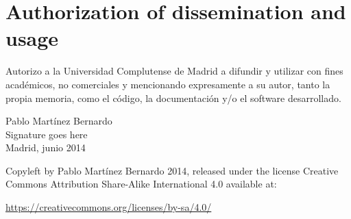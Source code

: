 
\newpage
\thispagestyle{empty}
\chapter*{Authorization of dissemination and usage}
\vfill
Autorizo a la Universidad Complutense de Madrid a difundir y utilizar con fines académicos, no comerciales y mencionando expresamente a su autor, tanto la propia memoria, como el código, la documentación y/o el software desarrollado. 
\begin{center}
  \vfill
  {\Large Pablo Martínez Bernardo\\}
  \vspace*{1cm}
  {\Huge Signature goes here\\}
  \vspace*{1cm}
  {\Large Madrid, junio 2014}
  \vfill
\end{center}
  Copyleft by Pablo Martínez Bernardo 2014, released under the license Creative Commons Attribution Share-Alike International 4.0 available at:
\begin{center}
\url{https://creativecommons.org/licenses/by-sa/4.0/}
\end{center}

\newpage
\tableofcontents
\newpage
\setcounter{page}{7}
\listoffigures
\listoftables
\newpage

